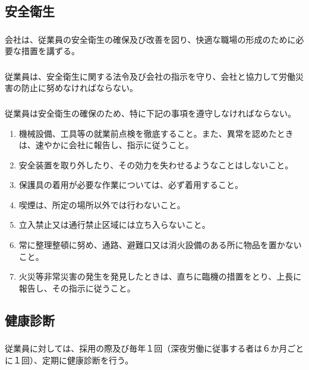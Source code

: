 \documentclass{jsarticle}
\begin{document}
\subsection{安全衛生}
\label{就規_条_安全衛生}
\subsubsection{}
\label{就規_項_安全衛生}
会社は、従業員の安全衛生の確保及び改善を図り、快適な職場の形成のために必要な措置を講ずる。
\subsubsection{}
\label{就規_項_労働災害防止の努力義務}
従業員は、安全衛生に関する法令及び会社の指示を守り、会社と協力して労働災害の防止に努めなければならない。
\subsubsection{}
\label{就規_項_安全衛生の確保}
従業員は安全衛生の確保のため、特に下記の事項を遵守しなければならない。
  \begin{enumerate}
    \item 機械設備、工具等の就業前点検を徹底すること。また、異常を認めたときは、速やかに会社に報告し、指示に従うこと。
    \item 安全装置を取り外したり、その効力を失わせるようなことはしないこと。
    \item 保護具の着用が必要な作業については、必ず着用すること。
    \item 喫煙は、所定の場所以外では行わないこと。
    \item 立入禁止又は通行禁止区域には立ち入らないこと。
    \item 常に整理整頓に努め、通路、避難口又は消火設備のある所に物品を置かないこと。
    \item 火災等非常災害の発生を発見したときは、直ちに臨機の措置をとり、上長に報告し、その指示に従うこと。
  \end{enumerate}

\subsection{健康診断}
\label{就規_条_健康診断}
\subsubsection{}
\label{就規_項_定期健康診断}
従業員に対しては、採用の際及び毎年１回（深夜労働に従事する者は６か月ごとに１回）、定期に健康診断を行う。
\end{document}
